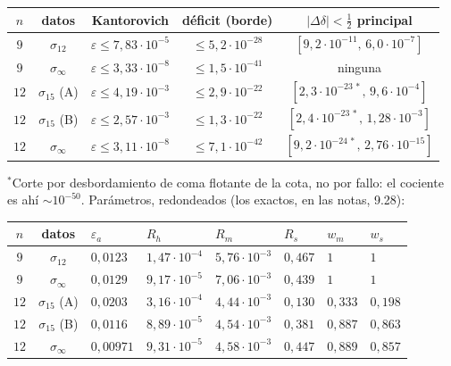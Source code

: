 \documentclass[11pt,a4paper]{article}
\theoremstyle{definition}
\theoremstyle{remark}
\newcommand{\eps}{\varepsilon}
\begin{document}
\begin{center}
\begin{tabular}{ccccc}
\toprule
$n$ & datos & Kantorovich & déficit (borde) & $|\Delta\delta|<\frac12$ principal\\
\midrule
$9$ & $\sigma_{12}$ & $\eps\le7{,}83\cdot10^{-5}$ & $\le5{,}2\cdot10^{-28}$ & $[9{,}2\cdot10^{-11},\,6{,}0\cdot10^{-7}]$\\
$9$ & $\sigma_\infty$ & $\eps\le3{,}33\cdot10^{-8}$ & $\le1{,}5\cdot10^{-41}$ & ninguna\\
$12$ & $\sigma_{15}$ (A) & $\eps\le4{,}19\cdot10^{-3}$ & $\le2{,}9\cdot10^{-22}$ & $[2{,}3\cdot10^{-23\,*},\,9{,}6\cdot10^{-4}]$\\
$12$ & $\sigma_{15}$ (B) & $\eps\le2{,}57\cdot10^{-3}$ & $\le1{,}3\cdot10^{-22}$ & $[2{,}4\cdot10^{-23\,*},\,1{,}28\cdot10^{-3}]$\\
$12$ & $\sigma_\infty$ & $\eps\le3{,}11\cdot10^{-8}$ & $\le7{,}1\cdot10^{-42}$ & $[9{,}2\cdot10^{-24\,*},\,2{,}76\cdot10^{-15}]$\\
\bottomrule
\end{tabular}
\end{center}

\noindent
${}^*$Corte por desbordamiento de coma flotante de la cota, no por fallo: el cociente es ahí $\sim10^{-50}$.
Parámetros, redondeados (los exactos, en las notas, 9.28):

\begin{center}
\begin{tabular}{ccllllll}
\toprule
$n$ & datos & $\eps_a$ & $R_h$ & $R_m$ & $R_s$ & $w_m$ & $w_s$\\
\midrule
$9$ & $\sigma_{12}$ & $0{,}0123$ & $1{,}47\cdot10^{-4}$ & $5{,}76\cdot10^{-3}$ & $0{,}467$ & $1$ & $1$\\
$9$ & $\sigma_\infty$ & $0{,}0129$ & $9{,}17\cdot10^{-5}$ & $7{,}06\cdot10^{-3}$ & $0{,}439$ & $1$ & $1$\\
$12$ & $\sigma_{15}$ (A) & $0{,}0203$ & $3{,}16\cdot10^{-4}$ & $4{,}44\cdot10^{-3}$ & $0{,}130$ & $0{,}333$ & $0{,}198$\\
$12$ & $\sigma_{15}$ (B) & $0{,}0116$ & $8{,}89\cdot10^{-5}$ & $4{,}54\cdot10^{-3}$ & $0{,}381$ & $0{,}887$ & $0{,}863$\\
$12$ & $\sigma_\infty$ & $0{,}00971$ & $9{,}31\cdot10^{-5}$ & $4{,}58\cdot10^{-3}$ & $0{,}447$ & $0{,}889$ & $0{,}857$\\
\bottomrule
\end{tabular}
\end{center}
\end{document}

